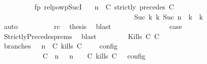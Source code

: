 \begin{isabellebody}
\ \ \ \ \ \ \ \ \isamarkupfalse%
\ fp\ relpowp{\isacharunderscore}Suc{\isacharunderscore}I{}\ \isamarkupfalse%
\ {\isacartoucheopen}{\isacharparenleft}{\isasymGamma}{\isacharcomma}\ n\ {\isasymturnstile}\ {\isacharparenleft}{\isacharparenleft}C\ strictly\ precedes\ C\ {\isacharhash}\ {\isasymPsi}{\isacharparenright}\ {\isasymtriangleright}\ {\isasymPhi}{\isacharparenright}\isanewline
\ \ \ \ \ \ \ \ \ \ \ \ \ \ \ \ \ \ \ \ \ \ \ \ \ \ \ \ \ \ \ \ \ \ \ \ \ \ {\isasymhookrightarrow}\isactrlbsup Suc\ k\isactrlesup \ {\isacharparenleft}{\isasymGamma}\isactrlsub k{\isacharcomma}\ Suc\ n\ {\isasymturnstile}\ {\isasymPsi}\isactrlsub k\ {\isasymtriangleright}\ {\isasymPhi}\isactrlsub k{\isacharparenright}{\isacartoucheclose}\isanewline
\ \ \ \ \ \ \ \ \ \ \isamarkupfalse%
\ auto\isanewline
\ \ \ \ \ \ \ \ \isamarkupfalse%
\ rc\ \isamarkupfalse%
\ {\isacharquery}thesis\ \isamarkupfalse%
\ blast\isanewline
\ \ \ \ \ \ \isamarkupfalse%
\isanewline
\ \ \ \ \ \ \isamarkupfalse%
\ \isamarkupfalse%
\ {\isacharquery}case\ \isamarkupfalse%
\ StrictlyPrecedes{\isachardot}prems{\isacharparenleft}{}{\isacharparenright}\ \isamarkupfalse%
\ blast\isanewline
\ \ \isamarkupfalse%
\isanewline
\ \ \ \ \isamarkupfalse%
\ {\isacharparenleft}Kills\ C\ C\isanewline
\ \ \ \ \ \ \isamarkupfalse%
\ branches{\isacharcolon}\ {\isacartoucheopen}{\isasymlbrakk}\ {\isasymGamma}{\isacharcomma}\ n\ {\isasymturnstile}\ {\isacharparenleft}{\isacharparenleft}C\ kills\ C\ {\isacharhash}\ {\isasymPsi}{\isacharparenright}\ {\isasymtriangleright}\ {\isasymPhi}\ {\isasymrbrakk}\isactrlsub c\isactrlsub o\isactrlsub n\isactrlsub f\isactrlsub i\isactrlsub g\isanewline
\ \ \ \ \ \ \ \ \ \ {\isacharequal}\ {\isasymlbrakk}\ {\isacharparenleft}{\isacharparenleft}C\ {\isasymnot}{\isasymUp}\ n{\isacharparenright}\ {\isacharhash}\ {\isasymGamma}{\isacharparenright}{\isacharcomma}\ n\ {\isasymturnstile}\ {\isasymPsi}\ {\isasymtriangleright}\ {\isacharparenleft}{\isacharparenleft}C\ kills\ C\ {\isacharhash}\ {\isasymPhi}{\isacharparenright}\ {\isasymrbrakk}\isactrlsub c\isactrlsub o\isactrlsub n\isactrlsub f\isactrlsub i\isactrlsub g\isanewline

\end{isabellebody}
